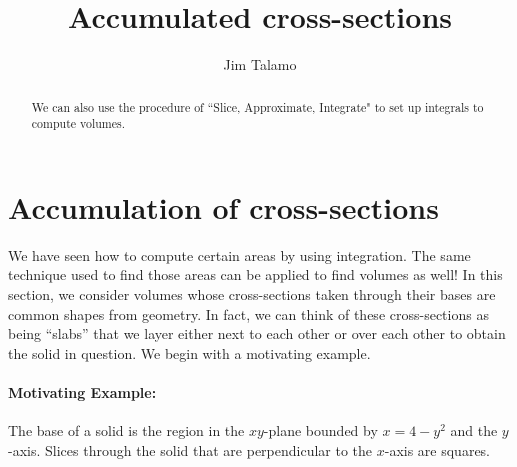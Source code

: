 \documentclass{ximera}
\author{Jim Talamo}
\title[Dig-In:]{Accumulated cross-sections}
\begin{document}
\begin{abstract}
  We can also use the procedure of ``Slice, Approximate, Integrate" to set up integrals to compute volumes.
\end{abstract}
\maketitle

\section{Accumulation of cross-sections}

We have seen how to compute certain areas by using integration. The same technique used to find those areas can be applied to find volumes as well! In this section, we consider volumes whose cross-sections taken through their bases are common shapes from geometry.  In fact, we can think of these cross-sections as being ``slabs'' that we layer either next to each other or over each other to obtain the solid in question.  We begin with a motivating example.




\paragraph{Motivating Example:} The base of a solid is the region in the $xy$-plane bounded by $x=4-y^2$ and the $y$-axis.  Slices through the solid that are perpendicular to the $x$-axis are squares.  
\end{document}
